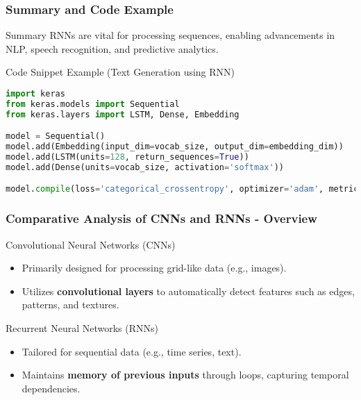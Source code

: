 \documentclass[aspectratio=169]{beamer}
\begin{document}
\begin{frame}[fragile]
    \frametitle{Summary and Code Example}
    \begin{block}{Summary}
        RNNs are vital for processing sequences, enabling advancements in NLP, speech recognition, and predictive analytics.
    \end{block}

    \begin{block}{Code Snippet Example (Text Generation using RNN)}
        \begin{lstlisting}[language=Python]
import keras
from keras.models import Sequential
from keras.layers import LSTM, Dense, Embedding

model = Sequential()
model.add(Embedding(input_dim=vocab_size, output_dim=embedding_dim))
model.add(LSTM(units=128, return_sequences=True))
model.add(Dense(units=vocab_size, activation='softmax'))

model.compile(loss='categorical_crossentropy', optimizer='adam', metrics=['accuracy'])
        \end{lstlisting}
    \end{block}
\end{frame}

\begin{frame}[fragile]
    \frametitle{Comparative Analysis of CNNs and RNNs - Overview}
    \begin{block}{Convolutional Neural Networks (CNNs)}
        \begin{itemize}
            \item Primarily designed for processing grid-like data (e.g., images).
            \item Utilizes \textbf{convolutional layers} to automatically detect features such as edges, patterns, and textures.
        \end{itemize}
    \end{block}
    
    \begin{block}{Recurrent Neural Networks (RNNs)}
        \begin{itemize}
            \item Tailored for sequential data (e.g., time series, text).
            \item Maintains \textbf{memory of previous inputs} through loops, capturing temporal dependencies.
        \end{itemize}
    \end{block}
\end{frame}
\end{document}
